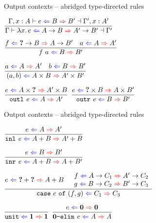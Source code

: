 \documentclass{beamer}
\begin{document}
\begin{frame}{Output contexts -- abridged type-directed rules}

\begin{center}
  $\infrule{\outctx[\extend{\Gamma}{x}{A}]{e}{B}{B'}[\extend{\Gamma'}{x}{A'}]}{\outctx{\fun{x}{e}}{\Fun{A}{B}}{\Fun{A'}{B'}}}$

  \vspace{2em}

  $\infrule{\shortoutctx{f}{\Fun{\Hole}{B}}{\Fun{A}{B'}} \quad \shortoutctx{a}{A}{A'}}{\shortoutctx{\app{f}{a}}{B}{B'}}$

  \vspace{2em}

  $\infrule{\shortoutctx{a}{A}{A'} \quad \shortoutctx{b}{B}{B'}}{\shortoutctx{\pair{a}{b}}{\Prod{A}{B}}{\Prod{A'}{B'}}}$

  \vspace{2em}

  $\infrule{\shortoutctx{e}{\Prod{A}{\Hole}}{\Prod{A'}{B}}}{\shortoutctx{\outl{e}}{A}{A'}}$
  \quad
  $\infrule{\shortoutctx{e}{\Prod{\Hole}{B}}{\Prod{A}{B'}}}{\shortoutctx{\outr{e}}{B}{B'}}$
\end{center}

\end{frame}

\begin{frame}{Output contexts -- abridged type-directed rules}

\begin{center}
  $\infrule{\shortoutctx{e}{A}{A'}}{\shortoutctx{\inl{e}}{\Sum{A}{B}}{\Sum{A'}{B}}}$

  \vspace{2em}

  $\infrule{\shortoutctx{e}{B}{B'}}{\shortoutctx{\inr{e}}{\Sum{A}{B}}{\Sum{A}{B'}}}$

  \vspace{2em}

  $\infrule{\shortoutctx{e}{\Sum{\Hole}{\Hole}}{\Sum{A}{B}} \quad \begin{array}{c} \shortoutctx{f}{\Fun{A}{C_1}}{\Fun{A'}{C_2}} \\ \shortoutctx{g}{\Fun{B}{C_2}}{\Fun{B'}{C_3}} \end{array}}{\shortoutctx{\case{e}{f}{g}}{C_1}{C_3}}$

  \vspace{2em}

  $\infrule{}{\shortoutctx{\unit}{\Unit}{\Unit}}$ \quad
  $\infrule{\shortoutctx{e}{\Empty}{\Empty}}{\shortoutctx{\emptyelim{e}}{A}{A}}$
\end{center}

\end{frame}
\end{document}

